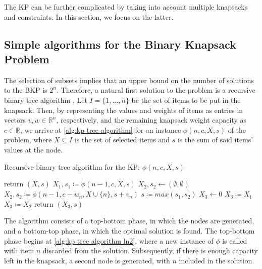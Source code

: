 The KP can be further complicated by taking into account multiple knapsacks and constraints. In this section, we focus on the latter.

\subsection{Simple algorithms for the Binary Knapsack Problem}

The selection of subsets implies that an upper bound on the number of solutions to the BKP is $2^n$. Therefore, a natural first solution to the problem is a recursive binary tree algorithm \cite{FEOFILOFF2020a}. Let $I = \{1,\dots,n\}$ be the set of items to be put in the knapsack. Then, by representing the values and weights of items as entries in vectors $v, w \in \mathbb{R}^n$, respectively, and the remaining knapsack weight capacity as $c \in \mathbb{R}$, we arrive at \cref{alg:kp tree algorithm} for an instance $\phi(n, c, X, s)$ of the problem, where $X \subseteq I$ is the set of selected items and $s$ is the sum of said items' values at the node.

\begin{algorithm}
    \caption{Recursive binary tree algorithm for the KP: $\phi(n, c, X, s)$}
    \label{alg:kp tree algorithm}
    \begin{algorithmic}[1]
         \label{alg:kp tree algorithm ln1}
            \State return $(X, s)$
        \EndIf
        \State $X_1, s_1 \coloneqq \phi(n - 1, c, X, s)$ \label{alg:kp tree algorithm ln2}
        \State $X_2, s_2 \gets (\emptyset, \emptyset)$
            \State $X_2, s_2 \coloneqq \phi(n - 1, c - w_n, X \cup \{n\}, s + v_n)$
        \EndIf
        \State $s \coloneqq max(s_1, s_2)$ \label{alg:kp tree algorithm ln3}
        \State $X_3 \gets 0$
            \State $X_3 \coloneqq X_1$
        \Else
            \State $X_3 \coloneqq X_2$
        \EndIf
        \State return $(X_3, s)$
    \end{algorithmic}
\end{algorithm}

The algorithm consists of a top-bottom phase, in which the nodes are generated, and a bottom-top phase, in which the optimal solution is found. The top-bottom phase begins at \cref{alg:kp tree algorithm ln2}, where a new instance of $\phi$ is called with item $n$ discarded from the solution. Subsequently, if there is enough capacity left in the knapsack, a second node is generated, with $n$ included in the solution.

